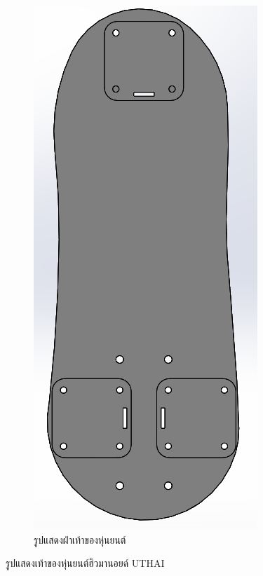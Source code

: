 \begin{figure}[!ht]
\begin{subfigure}[b]{0.2\linewidth}
    \includegraphics[width=\linewidth]{chapter4/images/bare_footold.PNG}
    \caption{รูปแสดงฝ่าเท้าของหุ่นยนต์}
  \end{subfigure}
  \caption{รูปแสดงเท้าของหุ่นยนต์ฮิวมานอยด์ UTHAI}
  \label{fig:footold}
\end{figure}

